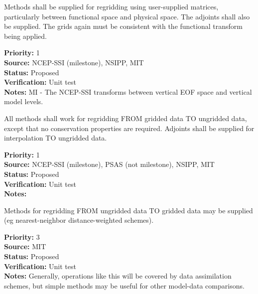 
Methods shall be supplied for regridding using user-supplied matrices,
particularly between functional space and physical space.
The adjoints shall also be supplied.  The grids again must be consistent
with the functional transform being applied.

\begin{reqlist}
{\bf Priority:} 1 \\
{\bf Source:}  NCEP-SSI (milestone), NSIPP, MIT \\
{\bf Status:} Proposed \\
{\bf Verification:} Unit test \\
{\bf Notes:} MI - The NCEP-SSI transforms between vertical EOF space
             and vertical model levels.
\end{reqlist}


All methods shall work for regridding FROM gridded data TO ungridded
data, except that no conservation properties are required.
Adjoints shall be supplied for interpolation TO ungridded data.

\begin{reqlist}
{\bf Priority:} 1 \\
{\bf Source:}  NCEP-SSI (milestone), PSAS (not milestone), NSIPP, MIT  \\
{\bf Status:} Proposed \\
{\bf Verification:} Unit test \\
{\bf Notes:} 
\end{reqlist}


Methods for regridding FROM ungridded data TO gridded data may be
supplied (eg nearest-neighbor distance-weighted schemes).

\begin{reqlist}
{\bf Priority:} 3 \\
{\bf Source:} MIT  \\
{\bf Status:} Proposed \\
{\bf Verification:} Unit test \\
{\bf Notes:} Generally, operations like this will be covered by
             data assimilation schemes, but simple methods may be useful
             for other model-data comparisons.
\end{reqlist}


